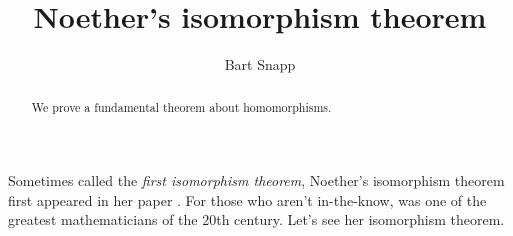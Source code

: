 \documentclass{ximera}
\author{Bart Snapp}
\title{Noether's isomorphism theorem}
\begin{document}
\begin{abstract}
  We prove a fundamental theorem about homomorphisms.
\end{abstract}
\maketitle

Sometimes called the \textit{first isomorphism theorem}, Noether's
isomorphism theorem first appeared in her paper .
For those who aren't in-the-know,  was one of the
greatest mathematicians of the 20th century. Let's see her isomorphism theorem.
\end{document}
